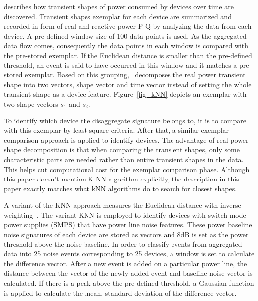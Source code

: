 \cite{shaw2000PhdThesis} describes how transient shapes of power consumed by devices over time are discovered.
Transient shapes exemplar for each device are summarized and recorded 
in form of real and reactive power P-Q by analyzing the data from each device. 
A pre-defined window size of 100 data points is used.
As the aggregated data flow comes, consequently 
the data points in each window is compared with 
the pre-stored exemplar. 
If the Euclidean distance is smaller than the pre-defined threshold, 
an event is said to have occurred in this window and 
it matches a pre-stored exemplar. 
Based on this grouping,~\cite{shaw2008nonintrusive} decomposes the 
real power transient shape into two vectors, shape vector and time vector 
instead of setting the whole transient shape as a device feature. 
Figure~\ref{fig_kNN} depicts an exemplar
with two shape vectors $s_1$ and $s_2$.

To identify which device the disaggregate signature belongs to,
it is to compare with this exemplar
by least square criteria.
After that, a similar exemplar comparison approach is applied to identify devices. 
The advantage of real power shape decomposition is that 
 when comparing the transient shapes,
only some characteristic parts are needed
rather than entire transient shapes in the data.
This helps cut computational cost for the exemplar comparison phase. 
Although this paper doesn't mention K-NN algorithm explicitly,
the description in this paper exactly matches what kNN algorithms do to search for closest shapes.

A variant of the KNN approach measures the Euclidean distance with inverse weighting~\cite{gupta2010electrisense}. 
The variant KNN is employed to identify devices
with switch mode power supplies (SMPS) that have power line noise features. 
These power baseline noise signatures of each device are stored as vectors 
and 8dB is set as the power threshold above the noise baseline.
In order to classify events from aggregated data into 25 noise events corresponding to 
25 devices, a window is set to calculate the difference vector. 
After a new event is added on a particular power line,
the distance between the vector of the newly-added event and 
baseline noise vector is calculated. 
If there is a peak above the pre-defined threshold, 
a Gaussian function is applied to calculate 
the mean, standard deviation of the difference vector. 

